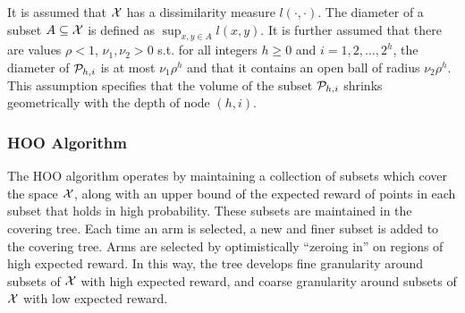 It is assumed that ${\mathcal{X}}$ has a dissimilarity measure
$l(\cdot,\cdot)$. The diameter of a subset $A \subseteq {\mathcal{X}}$ is
defined as $\sup_{x,y \in A}l(x,y)$. It is further assumed that there
are values $\rho < 1$, $\nu_1, \nu_2 > 0$ s.t. for all integers $h
\geq 0$ and $i = 1,2, \dots, 2^h$, the diameter of ${\mathcal{P}}_{h,i}$ is at
most $\nu_1 \rho^h$ and that it contains an open ball of radius $\nu_2
\rho^h$. This assumption specifies that the volume of the subset
${\mathcal{P}}_{h,i}$ shrinks geometrically with the depth of node $(h,i)$.

\subsubsection{HOO Algorithm}
The HOO algorithm operates by maintaining a collection of subsets
which cover the space ${\mathcal{X}}$, along with an upper bound of the expected
reward of points in each subset that holds in high probability. These
subsets are maintained in the covering tree. Each time an arm is
selected, a new and finer subset is added to the covering tree. Arms
are selected by optimistically ``zeroing in'' on regions of high
expected reward. In this way, the tree develops fine granularity
around subsets of ${\mathcal{X}}$ with high expected reward, and coarse
granularity around subsets of ${\mathcal{X}}$ with low expected reward.


